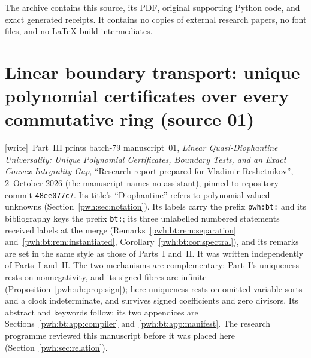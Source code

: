 \documentclass[11pt,letterpaper]{article}
\numberwithin{equation}{section}
\theoremstyle{definition}
\newcommand{\wtag}{\textup{[write]}}
\begin{document}
The archive contains this source, its PDF, original supporting Python
code, and exact generated receipts. It contains no copies of external
research papers, no font files, and no LaTeX build intermediates.


\part{Linear boundary transport: unique polynomial certificates over every commutative ring (source 01)}\label{pwh:part:bt}

\noindent\wtag\ Part~III prints batch-79 manuscript~01, \emph{Linear
Quasi-Diophantine Universality: Unique Polynomial Certificates, Boundary
Tests, and an Exact Convex Integrality Gap}, ``Research report prepared for
Vladimir Reshetnikov'', 2~October 2026 (the manuscript names no assistant),
pinned to repository commit \texttt{48ee077c7}. Its title's
``Diophantine'' refers to polynomial-valued unknowns
(Section~\ref{pwh:sec:notation}). Its labels carry the prefix
\texttt{pwh:bt:} and its bibliography keys the prefix \texttt{bt:}; its
three unlabelled numbered statements received labels at the merge
(Remarks~\ref{pwh:bt:rem:separation} and~\ref{pwh:bt:rem:instantiated},
Corollary~\ref{pwh:bt:cor:spectral}), and its remarks are set in the same
style as those of Parts~I and~II. It was written independently of
Parts~I and~II. The two mechanisms are complementary: Part~I's uniqueness
rests on nonnegativity, and its signed fibres are infinite
(Proposition~\ref{pwh:uh:prop:sign}); here uniqueness rests on
omitted-variable sorts and a clock indeterminate, and survives signed
coefficients and zero divisors. Its abstract and keywords follow; its two
appendices are Sections~\ref{pwh:bt:app:compiler}
and~\ref{pwh:bt:app:manifest}. The research programme reviewed this
manuscript before it was placed here~\cite{reviewBS}
(Section~\ref{pwh:sec:relation}).
\end{document}
